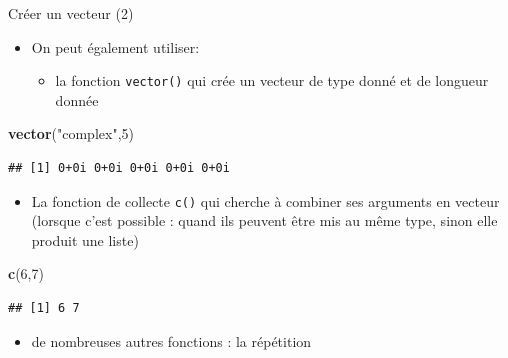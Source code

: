 \documentclass[
  ignorenonframetext,
]{beamer}
\newenvironment{Shaded}{\begin{snugshade}}{\end{snugshade}}
\newcommand{\DecValTok}[1]{\textcolor[rgb]{0.00,0.00,0.81}{#1}}
\newcommand{\FunctionTok}[1]{\textcolor[rgb]{0.13,0.29,0.53}{\textbf{#1}}}
\newcommand{\NormalTok}[1]{#1}
\newcommand{\StringTok}[1]{\textcolor[rgb]{0.31,0.60,0.02}{#1}}
\providecommand{\tightlist}{%
  \setlength{\itemsep}{0pt}\setlength{\parskip}{0pt}}
\begin{document}
\begin{frame}[fragile]{Créer un vecteur (2)}
\protect\hypertarget{cruxe9er-un-vecteur-2}{}
\begin{itemize}
\tightlist
\item
  On peut également utiliser:

  \begin{itemize}
  \tightlist
  \item
    la fonction \texttt{vector()} qui crée un vecteur de type donné et
    de longueur donnée
  \end{itemize}
\end{itemize}

\tiny

\begin{Shaded}
\begin{Highlighting}[]
\FunctionTok{vector}\NormalTok{(}\StringTok{"complex"}\NormalTok{,}\DecValTok{5}\NormalTok{)}
\end{Highlighting}
\end{Shaded}

\begin{verbatim}
## [1] 0+0i 0+0i 0+0i 0+0i 0+0i
\end{verbatim}

\normalsize

\begin{itemize}
\tightlist
\item
  La fonction de collecte \texttt{c()} qui cherche à combiner ses
  arguments en vecteur (lorsque c'est possible : quand ils peuvent être
  mis au même type, sinon elle produit une liste)
\end{itemize}

\tiny

\begin{Shaded}
\begin{Highlighting}[]
\FunctionTok{c}\NormalTok{(}\DecValTok{6}\NormalTok{,}\DecValTok{7}\NormalTok{)}
\end{Highlighting}
\end{Shaded}

\begin{verbatim}
## [1] 6 7
\end{verbatim}

\normalsize

\begin{itemize}
\tightlist
\item
  de nombreuses autres fonctions : la répétition
\end{itemize}

\tiny


\end{frame}
\end{document}
